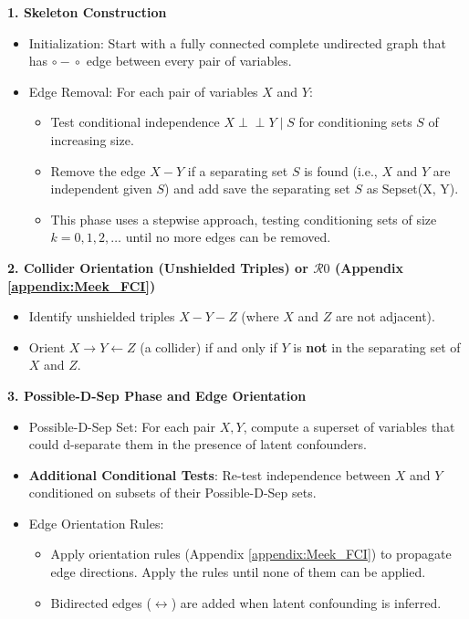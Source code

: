 \documentclass[main.tex]{subfiles}
\begin{document}
\textbf{1. Skeleton Construction}
\begin{itemize}
  \item Initialization: Start with a fully connected complete undirected graph that has $\circ\!\!-\!\!\circ$ edge between every pair of variables.
  \item Edge Removal: For each pair of variables $X$ and $Y$:
    \begin{itemize}
      \item Test conditional independence $X \perp\!\!\!\perp Y \mid S$ for conditioning sets $S$ of increasing size.
      \item Remove the edge $X - Y$ if a separating set $S$ is found (i.e., $X$ and $Y$ are independent given $S$) and add save the separating set $S$ as Sepset(X, Y). 
      \item This phase uses a stepwise approach, testing conditioning sets of size $k = 0, 1, 2, \dots$ until no more edges can be removed.
    \end{itemize}
\end{itemize}

\textbf{2. Collider Orientation (Unshielded Triples) or $\mathcal{R}0$ (Appendix \ref{appendix:Meek_FCI})}
\begin{itemize}
  \item Identify unshielded triples $X - Y - Z$ (where $X$ and $Z$ are not adjacent).
  \item Orient $X \rightarrow Y \leftarrow Z$ (a collider) if and only if $Y$ is \textbf{not} in the separating set of $X$ and $Z$.
\end{itemize}

\textbf{3. Possible-D-Sep Phase and Edge Orientation}
\begin{itemize}
  \item Possible-D-Sep Set: For each pair $X, Y$, compute a superset of variables that could d-separate them in the presence of latent confounders.
  \item \textbf{Additional Conditional Tests}: Re-test independence between $X$ and $Y$ conditioned on subsets of their Possible-D-Sep sets.
  \item Edge Orientation Rules:
    \begin{itemize}
      \item Apply orientation rules (Appendix \ref{appendix:Meek_FCI}) to propagate edge directions. Apply the rules until none of them can be applied.
      \item Bidirected edges ($\leftrightarrow$) are added when latent confounding is inferred.
    \end{itemize}
\end{itemize}
\end{document}
